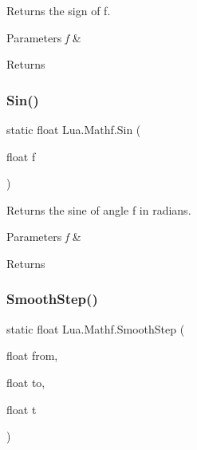 Returns the sign of f. 


\begin{DoxyParams}{Parameters}
{\em f} & \\
\hline
\end{DoxyParams}
\begin{DoxyReturn}{Returns}

\end{DoxyReturn}
\mbox{\label{class_lua_1_1_mathf_a23fb3f1fdbc09b29120c653bb184fb96}} 
\subsubsection{\texorpdfstring{Sin()}{Sin()}}
{\footnotesize\ttfamily static float Lua.\+Mathf.\+Sin (\begin{DoxyParamCaption}\item[{float}]{f }\end{DoxyParamCaption})\hspace{0.3cm}{\ttfamily [static]}}



Returns the sine of angle f in radians. 


\begin{DoxyParams}{Parameters}
{\em f} & \\
\hline
\end{DoxyParams}
\begin{DoxyReturn}{Returns}

\end{DoxyReturn}
\mbox{\label{class_lua_1_1_mathf_afee5fd526c03b9d4f8f5e6fc978e04b8}} 
\subsubsection{\texorpdfstring{SmoothStep()}{SmoothStep()}}
{\footnotesize\ttfamily static float Lua.\+Mathf.\+Smooth\+Step (\begin{DoxyParamCaption}\item[{float}]{from,  }\item[{float}]{to,  }\item[{float}]{t }\end{DoxyParamCaption})\hspace{0.3cm}{\ttfamily [static]}}



